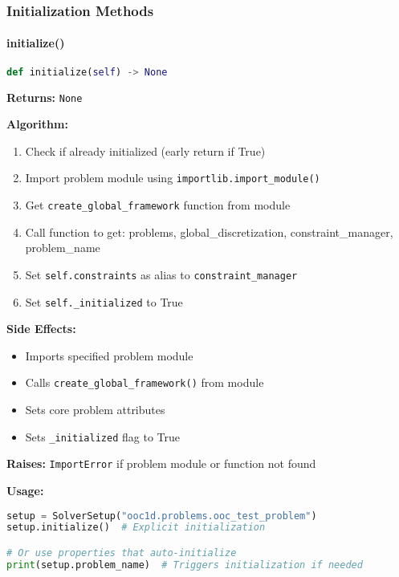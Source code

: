 \subsubsection{Initialization Methods}

\paragraph{initialize()}
\begin{lstlisting}[language=Python, caption=Initialize Method]
def initialize(self) -> None
\end{lstlisting}

\textbf{Returns:} \texttt{None}

\textbf{Algorithm:}
\begin{enumerate}
    \item Check if already initialized (early return if True)
    \item Import problem module using \texttt{importlib.import\_module()}
    \item Get \texttt{create\_global\_framework} function from module
    \item Call function to get: problems, global\_discretization, constraint\_manager, problem\_name
    \item Set \texttt{self.constraints} as alias to \texttt{constraint\_manager}
    \item Set \texttt{self.\_initialized} to True
\end{enumerate}

\textbf{Side Effects:}
\begin{itemize}
    \item Imports specified problem module
    \item Calls \texttt{create\_global\_framework()} from module
    \item Sets core problem attributes
    \item Sets \texttt{\_initialized} flag to True
\end{itemize}

\textbf{Raises:} \texttt{ImportError} if problem module or function not found

\textbf{Usage:}
\begin{lstlisting}[language=Python, caption=Initialize Usage]
setup = SolverSetup("ooc1d.problems.ooc_test_problem")
setup.initialize()  # Explicit initialization

# Or use properties that auto-initialize
print(setup.problem_name)  # Triggers initialization if needed
\end{lstlisting}

